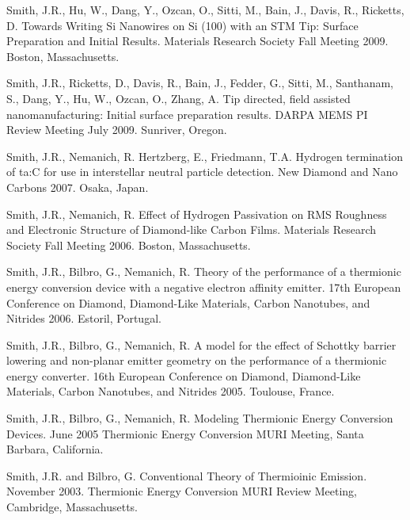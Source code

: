 \documentclass[letterpaper,margin,line]{res}
\begin{document}
\begin{resume}
Smith, J.R., Hu, W., Dang, Y., Ozcan, O., Sitti, M., Bain, J., Davis, R., Ricketts, D. Towards Writing Si Nanowires on Si (100) with an STM Tip: Surface Preparation and Initial Results. Materials Research Society Fall Meeting 2009. Boston, Massachusetts.

Smith, J.R., Ricketts, D., Davis, R., Bain, J., Fedder, G., Sitti, M., Santhanam, S., Dang, Y., Hu, W., Ozcan, O., Zhang, A. Tip directed, field assisted nanomanufacturing: Initial surface preparation results. DARPA MEMS PI Review Meeting July 2009. Sunriver, Oregon.

Smith, J.R., Nemanich, R. Hertzberg, E., Friedmann, T.A. Hydrogen termination of ta:C for use in interstellar neutral particle detection. New Diamond and Nano Carbons 2007. Osaka, Japan.

Smith, J.R., Nemanich, R. Effect of Hydrogen Passivation on RMS Roughness and Electronic Structure of Diamond-like Carbon Films. Materials Research Society Fall Meeting 2006. Boston, Massachusetts.

Smith, J.R., Bilbro, G., Nemanich, R. Theory of the performance of a thermionic energy conversion device with a negative electron affinity emitter. 17th European Conference on Diamond, Diamond-Like Materials, Carbon Nanotubes, and Nitrides 2006. Estoril, Portugal.


Smith, J.R., Bilbro, G., Nemanich, R. A model for the effect of Schottky barrier lowering and non-planar emitter geometry on the performance of a thermionic energy converter. 16th European Conference on Diamond, Diamond-Like Materials, Carbon Nanotubes, and Nitrides 2005. Toulouse, France.

Smith, J.R., Bilbro, G., Nemanich, R. Modeling Thermionic Energy Conversion Devices. June 2005 Thermionic Energy Conversion MURI Meeting, Santa Barbara, California.

Smith, J.R. and Bilbro, G. Conventional Theory of Thermioinic Emission. November 2003. Thermionic Energy Conversion MURI Review Meeting, Cambridge, Massachusetts.


\end{resume}
\end{document}
